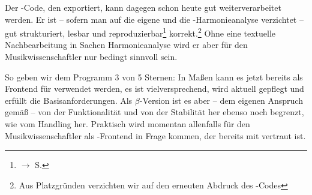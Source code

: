 Der -Code, den  exportiert, kann dagegen schon heute
gut weiterverarbeitet werden. Er ist -- sofern man auf die eigene und die
-Harmonieanalyse verzichtet -- gut strukturiert, lesbar und
reproduzierbar\footnote{$\rightarrow$ S.\pageref{ExportVerifikation}}
korrekt.\footnote{Aus Platzgründen verzichten wir auf den erneuten Abdruck des
-Codes} Ohne eine textuelle Nachbearbeitung in Sachen
Harmonieanalyse wird er aber für den Musikwissenschaftler nur bedingt sinnvoll
sein.

So geben wir dem Programm 3 von 5 Sternen: In Maßen kann es jetzt bereits als
Frontend für  verwendet werden, es ist vielversprechend, wird
aktuell gepflegt und erfüllt die Basisanforderungen. Als $\beta$-Version ist es
aber -- dem eigenen Anspruch gemäß -- von der Funktionalität und von der
Stabilität her ebenso noch begrenzt, wie vom Handling her. Praktisch wird
 momentan allenfalls für den Musikwissenschaftler als
-Frontend in Frage kommen, der bereits mit  vertraut
ist.


%
